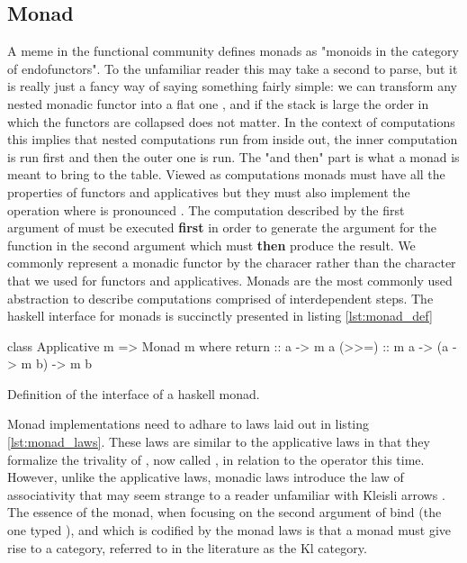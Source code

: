 \subsection{Monad}

A meme in the functional community defines monads as "monoids in the
category of endofunctors". To the unfamiliar reader this may take a
second to parse, but it is really just a fancy way of saying something
fairly simple: we can transform any nested monadic functor  into a flat one , and if the stack is large  the order in which the functors are collapsed does
not matter. In the context of computations this implies that nested
computations run from inside out, the inner computation is run first
and then the outer one is run. The "and then" part is what a monad is
meant to bring to the table. Viewed as computations monads must have
all the properties of functors and applicatives but they must also
implement the operation  where
\hask{>>=} is pronounced . The computation described by the
first argument of \hask{>>=} must be executed \textbf{first} in order
to generate the argument for the function in the second argument which
must \textbf{then} produce the result. We commonly represent a monadic
functor by the characer  rather than the character 
that we used for functors and applicatives. Monads are the most
commonly used abstraction to describe computations comprised of
interdependent steps. The haskell interface for monads is succinctly
presented in listing \ref{lst:monad_def}

\begin{code}
\begin{haskellcode}
class Applicative m => Monad m where
  return :: a -> m a
  (>>=) :: m a -> (a -> m b) -> m b
\end{haskellcode}
\label{lst:monad_def}
\caption{Definition of the interface of a haskell monad.}
\end{code}

Monad implementations need to adhare to laws laid out in listing
\ref{lst:monad_laws}. These laws are similar to the applicative laws
in that they formalize the trivality of , now called
, in relation to the  operator this
time. However, unlike the applicative laws, monadic laws introduce the
law of associativity that may seem strange to a reader unfamiliar with
Kleisli arrows \cite{dawsonCompoundMonadsKleisli2007}. The essence of
the monad, when focusing on the second argument of bind (the one typed
), and which is codified by the monad laws is that a
monad  must give rise to a category, referred to in the
literature as the Kl category.

